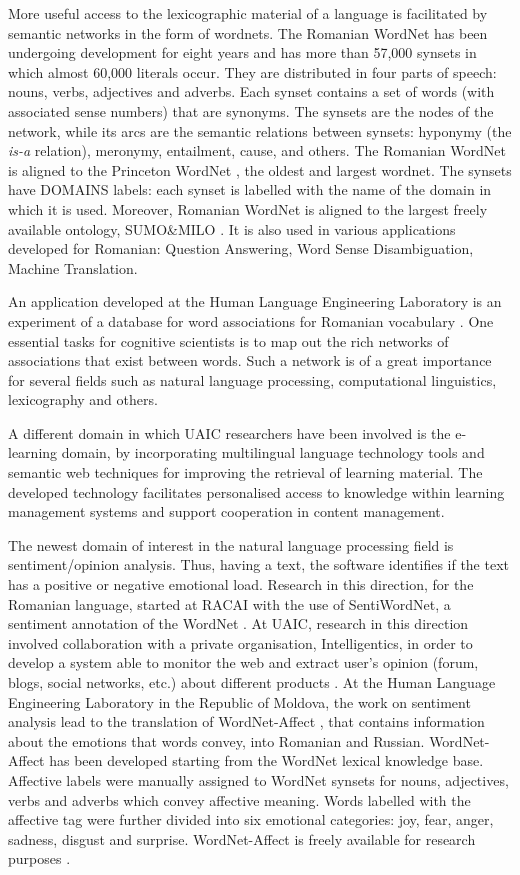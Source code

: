 \begin{multicols}{2}
More useful access to the lexicographic material of a language is facilitated by semantic networks in the form of wordnets. The Romanian WordNet has been undergoing development for eight years and has more than 57,000 synsets in which almost 60,000 literals occur. They are distributed in four parts of speech: nouns, verbs, adjectives and adverbs. Each synset contains a set of words (with associated sense numbers) that are synonyms. The synsets are the nodes of the network, while its arcs are the semantic relations between synsets: hyponymy (the \textit{is-a} relation), meronymy, entailment, cause, and others. The Romanian WordNet is aligned to the Princeton WordNet \cite{wnURL}, the oldest and largest wordnet. The synsets have DOMAINS labels: each synset is labelled with the name of the domain in which it is used. Moreover, Romanian WordNet is aligned to the largest freely available ontology, SUMO\&MILO \cite{ro_wnURL}. It is also used in various applications developed for Romanian: Question Answering, Word Sense Disambiguation, Machine Translation.

An application developed at the Human Language Engineering Laboratory is an experiment of a database for word associations for Romanian vocabulary \cite{sem_dict}. One essential tasks for cognitive scientists is to map out the rich networks of associations that exist between words. Such a network is of a great importance for several fields such as natural language processing, computational linguistics, lexicography and others.

A different domain in which UAIC researchers have been involved is the e-learning domain, by incorporating multilingual language technology tools and semantic web techniques for improving the retrieval of learning material. The developed technology facilitates personalised access to knowledge within learning management systems and support cooperation in content management.

The newest domain of interest in the natural language processing field is sentiment/opinion analysis. Thus, having a text, the software identifies if the text has a positive or negative emotional load. Research in this direction, for the Romanian language, started at RACAI with the use of SentiWordNet, a sentiment annotation of the WordNet \cite{sentiwn}. At UAIC, research in this direction involved collaboration with a private organisation, Intelligentics, in order to develop a system able to monitor the web and extract user’s opinion (forum, blogs, social networks, etc.) about different products \cite{sentimatrix}. At the Human Language Engineering Laboratory in the Republic of Moldova, the work on sentiment analysis lead to the translation of WordNet-Affect \cite{senti_md}, that contains information about the emotions that words convey, into Romanian and Russian. WordNet-Affect has been developed starting from the WordNet lexical knowledge base. Affective labels were manually assigned to WordNet synsets for nouns, adjectives, verbs and adverbs which convey affective meaning. Words labelled with the affective tag were further divided into six emotional categories: joy, fear, anger, sadness, disgust and surprise. WordNet-Affect is freely available for research purposes \cite{wndom}.


\end{multicols}
